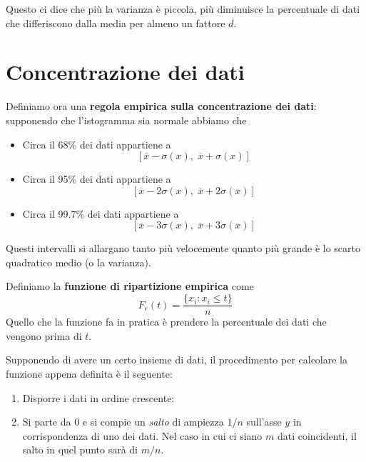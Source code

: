 \begin{observation}
	Questo ci dice che più la varianza è piccola, più diminuisce la percentuale di dati che differiscono dalla
	media per almeno un fattore $d$.
\end{observation}

\section{Concentrazione dei dati}
\begin{definition}
	Definiamo ora una \textbf{regola empirica sulla concentrazione dei dati}: supponendo che l'istogramma sia
	normale abbiamo che
	\begin{itemize}
		\item Circa il 68\% dei dati appartiene a
		      \[ [ \overline{x} - \sigma(x),\; \overline{x} + \sigma(x) ] \]
		\item Circa il 95\% dei dati appartiene a
		      \[ [ \overline{x} - 2 \sigma(x),\; \overline{x} + 2 \sigma(x) ] \]
		\item Circa il 99.7\% dei dati appartiene a
		      \[ [ \overline{x} - 3 \sigma(x),\; \overline{x} + 3 \sigma(x) ] \]
	\end{itemize}
	Questi intervalli si allargano tanto più velocemente quanto più grande è lo scarto quadratico medio (o la
	varianza).
\end{definition}

\begin{definition}
	Definiamo la \textbf{funzione di ripartizione empirica} come
	\[ F_e(t) = \frac{\{ x_i : x_i \leq t \}}{n} \]
	Quello che la funzione fa in pratica è prendere la percentuale dei dati che vengono prima di $t$.
\end{definition}

Supponendo di avere un certo insieme di dati, il procedimento per calcolare la funzione appena definita è il
seguente:
\begin{enumerate}
	\item Disporre i dati in ordine crescente:
	\item Si parte da 0 e si compie un \emph{salto} di ampiezza $1 / n$ sull'asse $y$ in corrispondenza di uno
	      dei dati. Nel caso in cui ci siano $m$ dati coincidenti, il salto in quel punto sarà di $m / n$.
\end{enumerate}

